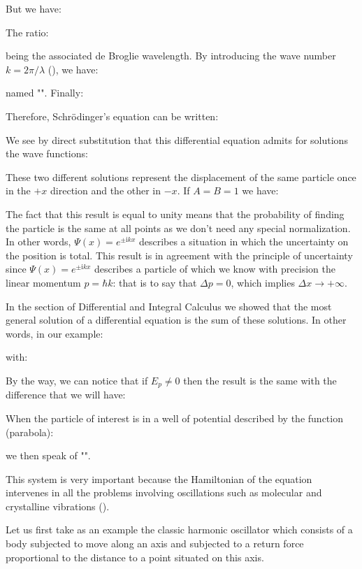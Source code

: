 	But we have:
	
	The ratio:
	
	being the associated de Broglie wavelength. By introducing the wave number $k=2\pi/\lambda$ (), we have:
	
	named "". Finally:
	
	Therefore, Schrödinger's equation can be written:
	
	We see by direct substitution that this differential equation admits for solutions the wave functions:
	
	These two different solutions represent the displacement of the same particle once in the $+x$ direction and the other in $-x$. If $A=B=1$ we have:
	
	The fact that this result is equal to unity means that the probability of finding the particle is the same at all points as we don't need any special normalization. In other words, $\Psi(x)=e^{\pm\mathrm{i}kx}$ describes a situation in which the uncertainty on the position is total. This result is in agreement with the principle of uncertainty since $\Psi(x)=e^{\pm\mathrm{i}kx}$  describes a particle of which we know with precision the linear momentum $p=\hbar k$: that is to say that $\Delta p=0$, which implies $\Delta x\rightarrow +\infty$.

	In the section of Differential and Integral Calculus we showed that the most general solution of a differential equation is the sum of these solutions. In other words, in our example:
	
	with:
	
	By the way, we can notice that if $E_p\neq 0$ then the result is the same with the difference that we will have:
	
	When the particle of interest is in a well of potential described by the function (parabola):
	
	we then speak of "".

	This system is very important because the Hamiltonian of the equation intervenes in all the problems involving oscillations such as molecular and crystalline vibrations ().

	Let us first take as an example the classic harmonic oscillator which consists of a body subjected to move along an axis and subjected to a return force proportional to the distance to a point situated on this axis.


